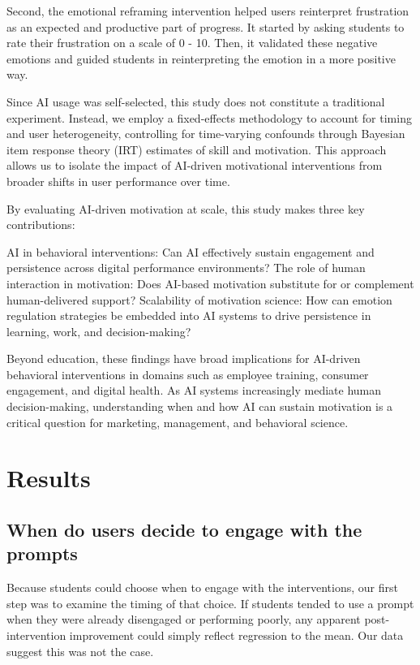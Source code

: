 \documentclass[11pt]{report}
\begin{document}
\begin{mainf}
Second, the emotional reframing intervention helped users reinterpret frustration as an expected and productive part of progress. It started by asking students to rate their frustration on a scale of 0 - 10. Then, it validated these negative emotions and guided students in reinterpreting the emotion in a more positive way.

Since AI usage was self-selected, this study does not constitute a traditional experiment. 
Instead, we employ a fixed-effects methodology to account for timing and user heterogeneity, controlling for time-varying confounds through Bayesian item response theory (IRT) estimates of skill and motivation. 
This approach allows us to isolate the impact of AI-driven motivational interventions from broader shifts in user performance over time.

By evaluating AI-driven motivation at scale, this study makes three key contributions:

AI in behavioral interventions: Can AI effectively sustain engagement and persistence across digital performance environments?
The role of human interaction in motivation: Does AI-based motivation substitute for or complement human-delivered support?
Scalability of motivation science: How can emotion regulation strategies be embedded into AI systems to drive persistence in learning, work, and decision-making?

Beyond education, these findings have broad implications for AI-driven behavioral interventions in domains such as employee training, consumer engagement, and digital health. 
As AI systems increasingly mediate human decision-making, understanding when and how AI can sustain motivation is a critical question for marketing, management, and behavioral science.

\section*{Results} 

\subsection*{When do users decide to engage with the prompts}
Because students could choose when to engage with the interventions, our first step was to examine the timing of that choice.
If students tended to use a prompt when they were already disengaged or performing poorly, any apparent post-intervention improvement could simply reflect regression to the mean.
Our data suggest this was not the case. 


\end{mainf}
\end{document}
